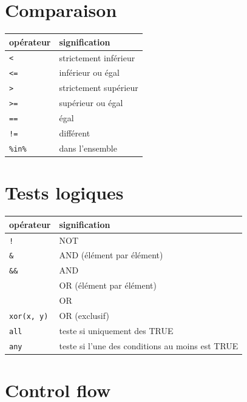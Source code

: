 \documentclass[
  letterpaper,
  DIV=11,
  numbers=noendperiod]{scrreprt}
\begin{document}
\hypertarget{comparaison}{%
\section{Comparaison}\label{comparaison}}

\begin{longtable}[]{@{}ll@{}}
\toprule\noalign{}
opérateur & signification \\
\midrule\noalign{}
\endhead
\bottomrule\noalign{}
\endlastfoot
\texttt{\textless{}} & strictement inférieur \\
\texttt{\textless{}=} & inférieur ou égal \\
\texttt{\textgreater{}} & strictement supérieur \\
\texttt{\textgreater{}=} & supérieur ou égal \\
\texttt{==} & égal \\
\texttt{!=} & différent \\
\texttt{\%in\%} & dans l'ensemble \\
\end{longtable}

\hypertarget{tests-logiques}{%
\section{Tests logiques}\label{tests-logiques}}

\begin{longtable}[]{@{}ll@{}}
\toprule\noalign{}
opérateur & signification \\
\midrule\noalign{}
\endhead
\bottomrule\noalign{}
\endlastfoot
\texttt{!} & NOT \\
\texttt{\&} & AND (élément par élément) \\
\texttt{\&\&} & AND \\
\texttt{\textbar{}} & OR (élément par élément) \\
\texttt{\textbar{}\textbar{}} & OR \\
\texttt{xor(x,\ y)} & OR (exclusif) \\
\texttt{all} & teste si uniquement des TRUE \\
\texttt{any} & teste si l'une des conditions au moins est TRUE \\
\end{longtable}

\hypertarget{control-flow-1}{%
\section{Control flow}\label{control-flow-1}}
\end{document}
